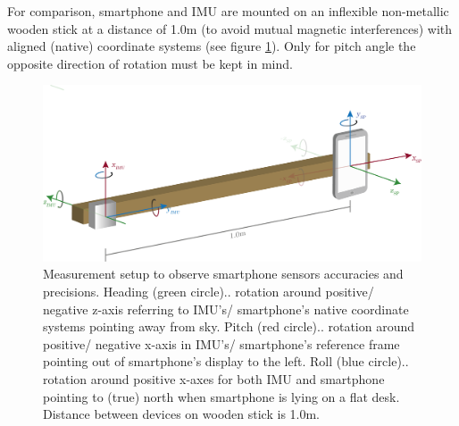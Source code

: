 \documentclass[review]{elsarticle}
\begin{document}

For comparison, smartphone and \gls{IMU} are mounted on an inflexible non-metallic wooden stick at a distance of 1.0m (to avoid mutual magnetic interferences) with aligned (native) coordinate systems (see figure \ref{fig:technology:sensor:construction}). Only for pitch angle the opposite direction of rotation must be kept in mind.  

\begin{figure}[htbp!]
\begin{center}
	\centering
	\includegraphics[keepaspectratio, width=1\columnwidth]{graphics/sensor_construction}
	\caption{Measurement setup to observe smartphone sensors accuracies and precisions. Heading (green circle).. rotation around positive/ negative z-axis referring to \gls{IMU}'s/ smartphone's native coordinate systems pointing away from sky. Pitch (red circle).. rotation around positive/ negative x-axis in \gls{IMU}'s/ smartphone's reference frame pointing out of smartphone's display to the left. Roll (blue circle).. rotation around positive x-axes for both \gls{IMU} and smartphone pointing to (true) north when smartphone is lying on a flat desk. Distance between devices on wooden stick is 1.0m.}
	\label{fig:technology:sensor:construction}
\end{center}
\end{figure}
\end{document}
